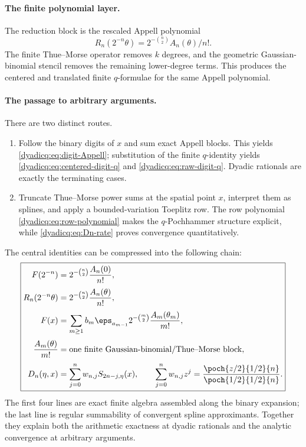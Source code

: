 \documentclass[11pt,oneside]{article}
\theoremstyle{definition}
\theoremstyle{remark}
\begin{document}
\paragraph{The finite polynomial layer.}
The reduction block is the rescaled Appell polynomial
\[
 R_n(2^{-n}\theta)=2^{-\binom n2}A_n(\theta)/n!.
\]
The finite Thue--Morse operator removes $k$ degrees, and the geometric
Gaussian-binomial stencil removes the remaining lower-degree terms.  This
produces the centered and translated finite $q$-formulae for the same Appell
polynomial.

\paragraph{The passage to arbitrary arguments.}
There are two distinct routes.
\begin{enumerate}
\item Follow the binary digits of $x$ and sum exact Appell blocks.  This yields
  \eqref{dyadicq:eq:digit-Appell}; substitution of the finite $q$-identity yields
  \eqref{dyadicq:eq:centered-digit-q} and \eqref{dyadicq:eq:raw-digit-q}.  Dyadic rationals are
  exactly the terminating cases.
\item Truncate Thue--Morse power sums at the spatial point $x$, interpret them
  as splines, and apply a bounded-variation Toeplitz row.  The row polynomial
  \eqref{dyadicq:eq:row-polynomial} makes the $q$-Pochhammer structure explicit, while
  \eqref{dyadicq:eq:Dn-rate} proves convergence quantitatively.
\end{enumerate}

The central identities can be compressed into the following chain:
\begin{equation}\label{dyadicq:eq:final-chain}
\boxed{
\begin{aligned}
 F(2^{-n})
 &=2^{-\binom n2}\frac{A_n(0)}{n!},\\[0.25em]
 R_n(2^{-n}\theta)
 &=2^{-\binom n2}\frac{A_n(\theta)}{n!},\\[0.25em]
 F(x)
 &=\sum_{m\ge1}b_m\eps_{a_{m-1}}
   2^{-\binom m2}\frac{A_m(\theta_m)}{m!},\\[0.25em]
 \frac{A_m(\theta)}{m!}
 &=\text{one finite Gaussian-binomial/Thue--Morse block},\\[0.25em]
 D_n(\eta,x)
 &=\sum_{j=0}^nw_{n,j}S_{2n-j,\eta}(x),
 \qquad
 \sum_{j=0}^nw_{n,j}z^j
 =\frac{\poch{z/2}{1/2}{n}}{\poch{1/2}{1/2}{n}}.
\end{aligned}}
\end{equation}
The first four lines are exact finite algebra assembled along the binary
expansion; the last line is regular summability of convergent spline
approximants.  Together they explain both the arithmetic exactness at dyadic
rationals and the analytic convergence at arbitrary arguments.
\end{document}
